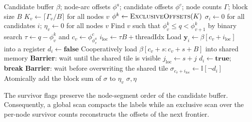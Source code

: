 \documentclass[letterpaper]{article}
\begin{document}
\begin{algorithm}[t]
\caption{Load-Balanced GPU Dominance Filtering}
\label{alg:dynamic_1D_kernel}
\begin{algorithmic}[1]
\Require Candidate buffer $\beta$; node-arc offsets $\phi^a$; candidate offsets $\phi^c$; node counts $\Gamma$; block size $B$
    \State $K_v\gets\lceil\Gamma_v/B\rceil$ for all nodes $v$
    \State $\phi^k\gets\Call{ExclusiveOffsets}{K}$
    \State $\sigma_i\gets 0$ for all candidates $i$; $\eta_v\gets0$ for all nodes $v$
        \State Find $v$ such that $\phi^k_v\le q<\phi^k_{v+1}$ by binary search
        \State $\tau\gets q-\phi^k_v$ and $c_v\gets\phi^c_{\phi^a_v}$
        \State $i_{\mathrm{loc}}\gets\tau B+\text{threadIdx}$
            \State Load $\mathbf{y}_i\gets\beta[c_v+i_{\mathrm{loc}}]$ into a register
        \EndIf
        \State $d_i\gets\mathbf{false}$
            \State Cooperatively load $\beta[c_v+s:c_v+s+B]$ into shared memory
            \State \textbf{Barrier}: wait until the shared tile is visible
                    \State $j_{\mathrm{loc}}\gets s+j$
                        \State $d_i\gets\mathbf{true}$; \textbf{break}
                    \EndIf
                \EndFor
            \EndIf
            \State \textbf{Barrier}: wait before overwriting the shared tile
        \EndFor
            \State $\sigma_{c_v+i_{\mathrm{loc}}}\gets\mathbb{I}[\neg d_i]$
        \EndIf
        \State Atomically add the block sum of $\sigma$ to $\eta_v$
    \EndFor
    \State \Return $\sigma,\eta$
\EndProcedure
\end{algorithmic}
\end{algorithm}

The survivor flags preserve the node-segment order of the candidate buffer. Consequently, a global scan compacts the labels while an exclusive scan over the per-node survivor counts reconstructs the offsets of the next frontier.
\end{document}
